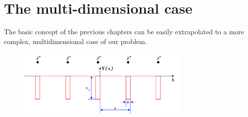 \chapter{The multi-dimensional case}

The basic concept of the previous chapters can be easily extrapolated to a more complex, multidimensional case of our problem.

\begin{figure}[h!] \centering
	  \includegraphics[width=0.75\textwidth]{Periodic_square_potential_130707} 
\end{figure}